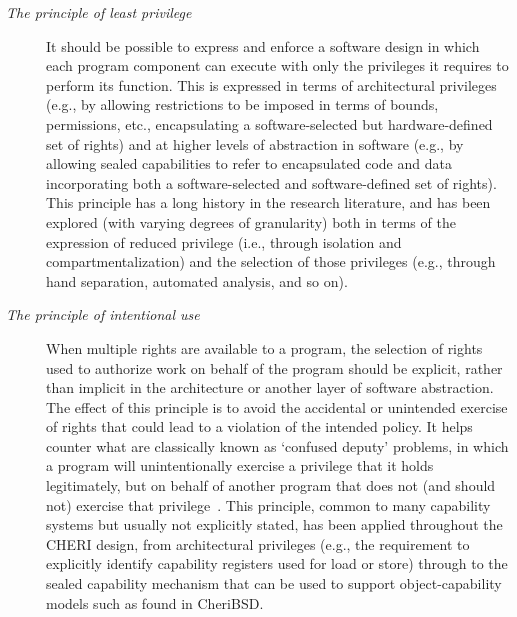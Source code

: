 \begin{description}
\item[\textit{The principle of least privilege}] It should be possible to
  express and enforce a software design in which each program component can execute
  with only the privileges it requires to perform its function.
  This is expressed in terms of architectural privileges (e.g., by allowing
  restrictions to be imposed in terms of bounds, permissions, etc.,
  encapsulating a software-selected but hardware-defined set of rights) and at
  higher levels of abstraction in software (e.g., by allowing sealed
  capabilities to refer to encapsulated code and data incorporating both a
  software-selected and software-defined set of rights).
  This principle has a long history in the research literature, and has been
  explored (with varying degrees of granularity) both in terms of the expression
  of reduced privilege (i.e., through isolation and compartmentalization) and
  the selection of those privileges (e.g., through hand separation, automated
  analysis, and so on).

\item[\textit{The principle of intentional use}]  When multiple rights
  are available to a program, the selection of rights used to authorize work
  on behalf of the program should be explicit, rather than implicit in the
  architecture or another layer of software abstraction.
  The effect of this principle is to avoid the accidental or unintended
  exercise of rights that could lead to a violation of the intended policy.
  It helps counter what are classically known as
  `confused deputy' problems, in which a program will unintentionally exercise
  a privilege that it holds legitimately, but on behalf of another program
  that does not (and should not) exercise that privilege~\cite{Hardy1988}.
  This principle, common to many capability systems but usually not explicitly
  stated, has been applied throughout the CHERI design, from architectural
  privileges (e.g., the requirement to explicitly identify capability
  registers used for load or store) through to the sealed capability mechanism
  that can be used to support object-capability models such as found in
  CheriBSD.
\end{description}

